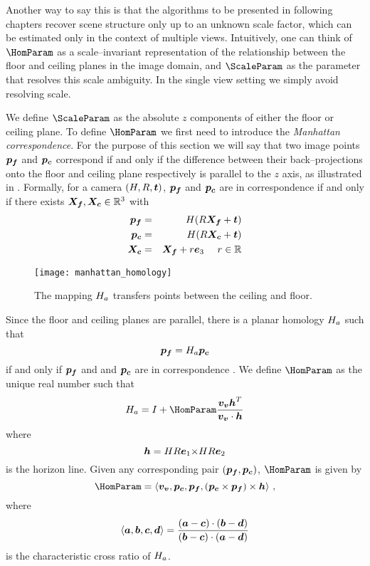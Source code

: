 Another way to say this is that the algorithms to be presented in
following chapters recover scene structure only up to an unknown scale
factor, which can be estimated only in the context of multiple
views. Intuitively, one can think of $\HomParam$ as a scale--invariant
representation of the relationship between the floor and ceiling
planes in the image domain, and $\ScaleParam$ as the parameter that
resolves this scale ambiguity. In the single view setting we simply
avoid resolving scale.

We define $\ScaleParam$ as the absolute $z$ components of either the
floor or ceiling plane. To define $\HomParam$ we first need to
introduce the \textit{Manhattan correspondence}. For the purpose of
this section we will say that two image points $\FloorPt$ and
$\CeilPt$ correspond if and only if the difference between their
back--projections onto the floor and ceiling plane respectively is
parallel to the $z$ axis, as illustrated in
. Formally, for a camera $(\CamMatrix,\CamR,\CamTr)$,
$\FloorPt$ and $\CeilPt$ are in correspondence if and only if there
exists $\FloorVec,\CeilVec \in \Rthree$ with
\begin{eqnarray}
  \FloorPt &=& \CamMatrix (\CamR \FloorVec + \CamTr) \\
  \CeilPt &=& \CamMatrix (\CamR \CeilVec + \CamTr) \\
  \CeilVec &=& \FloorVec + r \ez ~~~~ r \in \Reals
\end{eqnarray}

\begin{figure}[tb]
  \centering
  \texttt{[image: manhattan\_homology]}
  \caption{The mapping $\Hcf$ transfers points between the ceiling
    and floor.}
  \label{fig:homology}
\end{figure}

Since the floor and ceiling planes are parallel, there is a planar
homology $\Hcf$ such that
\begin{equation}
  \FloorPt = \Hcf \CeilPt
\end{equation}
if and only if $\pfloor$ and and $\pceil$ are in correspondence
\cite{Criminisi01}. We define $\HomParam$ as the unique real number
such that
\begin{equation}
  \label{eq:manhattanhom}
  \Hcf = I + \HomParam\frac{\vvpt\horizon^T}{\vvpt \cdot \horizon}
\end{equation}
where
\begin{equation}
  \horizon = \CamMatrix\CamR\ex \cross \CamMatrix\CamR\ey
\end{equation}
is the horizon line. Given any corresponding pair
$(\FloorPt,\CeilPt)$, $\HomParam$ is given by \cite{Criminisi01}
\begin{equation}
  \HomParam = 
  \langle\vvpt,\CeilPt,\FloorPt,(\CeilPt\times\FloorPt)\times\horizon\rangle ~,
\end{equation}
where
\begin{equation}
  \langle \vect{a},\vect{b},\vect{c},\vect{d} \rangle = \frac{
    (\vect{a}-\vect{c}) \cdot (\vect{b}-\vect{d})
  }{
    (\vect{b}-\vect{c}) \cdot (\vect{a}-\vect{d})
  }
\end{equation}
is the characteristic cross ratio of $\Hcf$.

